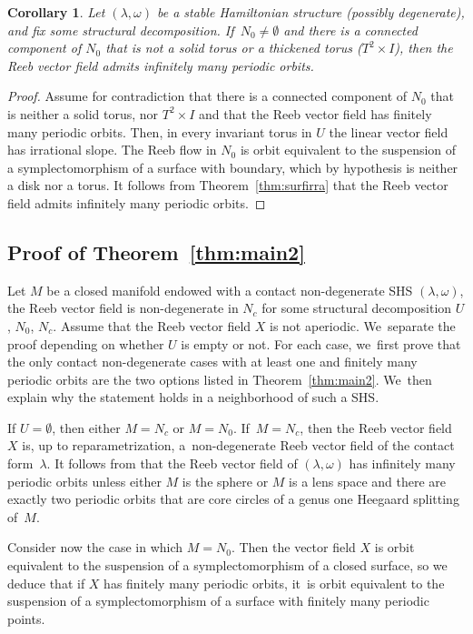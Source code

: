 \documentclass[JEP,XML,SOM,Unicode,NoEqCountersInSection,NoFloatCountersInSection,published]{cedram}
\newtheorem{Corollary}[theorem]{Corollary}
\theoremstyle{definition}
\begin{document}
\begin{Corollary}
Let $(\lambda, \omega)$ be a stable Hamiltonian structure ({possibly} degenerate), and fix some structural decomposition. If~$N_0\neq \emptyset$ and there is a connected component of $N_0$ that is not a solid torus or a thickened torus ($T^2\times I$), then the Reeb vector field admits infinitely many periodic orbits.
\end{Corollary}

\begin{proof}
Assume for contradiction that there is a connected component of $N_0$ that is neither a solid torus, nor $T^2\times I$ and that the Reeb vector field has finitely many periodic orbits. Then, in every invariant torus in $U$ the linear vector field has irrational slope. The Reeb flow in $N_0$ is orbit equivalent to the suspension of a symplectomorphism of a surface with boundary, which by hypothesis is neither a disk nor a torus. It follows from Theorem~\ref{thm:surfirra} that the Reeb vector field admits infinitely many periodic orbits.
\end{proof}

\subsection{Proof of Theorem~\ref{thm:main2}}

Let $M$ be a closed manifold endowed with a contact non-degenerate SHS $(\lambda,\omega)$, \ie the Reeb vector field is non-degenerate in $N_c$ for some structural decomposition $U$, $N_0$, $N_c$. Assume that the Reeb vector field $X$ is not aperiodic. We~separate the proof depending on whether $U$ is empty or not. For each case, we~first prove that the only contact non-degenerate cases with at least one and finitely many periodic orbits are the two options listed in Theorem~\ref{thm:main2}. We~then explain why
the statement holds in a neighborhood of such a SHS.

{If $U\!=\!\emptyset$, then either $M\!=\!N_c$ or $M\!=\!N_0$. If~$M\!=\!N_c$,} then the Reeb vector field~$X$ is, up to reparametrization, a~non-degenerate Reeb vector field of the contact form~$\lambda$.
It follows from \cite[Th.\,1.2]{CDR} that the Reeb vector field of $(\lambda, \omega)$ has infinitely many periodic orbits unless either $M$ is the sphere or $M$ is a lens space and there are exactly two periodic orbits that are core circles of a genus one Heegaard splitting of~$M$.

Consider now the case in which $M=N_0$. Then the vector field $X$ is orbit equivalent to the suspension of a symplectomorphism of a closed surface, so we deduce that if $X$ has finitely many periodic orbits, it~is orbit equivalent to the suspension of a symplectomorphism of a surface with finitely many periodic points.
\end{document}
